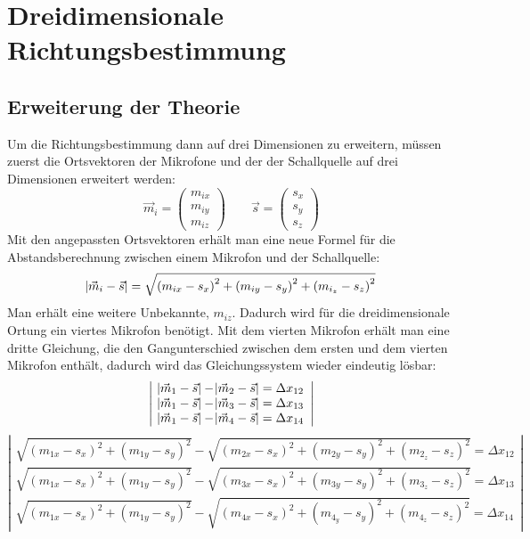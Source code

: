 \section{Dreidimensionale Richtungsbestimmung}
\subsection{Erweiterung der Theorie}
Um die Richtungsbestimmung dann auf drei Dimensionen zu erweitern, müssen zuerst die Ortsvektoren der Mikrofone und der der Schallquelle auf drei Dimensionen erweitert werden: $$\vec{m}_i = \begin{pmatrix}
m_{ix} \\
m_{iy} \\
m_{iz}
\end{pmatrix} \quad\quad
\vec{s} = \begin{pmatrix}
{s_x} \\
{s_y} \\
{s_z}
\end{pmatrix}$$
Mit den angepassten Ortsvektoren erhält man eine neue Formel für die Abstandsberechnung zwischen einem Mikrofon und der Schallquelle:
$$\abs{\vec{m}_i - \vec{s}} = \sqrt{{(m_{ix} - s_x)}^2 + {(m_{iy} - s_y)}^2 + {(m_{i_z} - s_z)}^2}$$
Man erhält eine weitere Unbekannte, $m_{iz}$. Dadurch wird für die dreidimensionale Ortung ein viertes Mikrofon benötigt. Mit dem vierten Mikrofon erhält man eine dritte Gleichung, die den Gangunterschied zwischen dem ersten und dem vierten Mikrofon enthält, dadurch wird das Gleichungssystem wieder eindeutig lösbar:
$$\left|\begin{array}{c}
\abs{\vec{m}_1 - \vec{s}} - \abs{\vec{m}_2 - \vec{s}} = \Delta{x_{12}} \\
\abs{\vec{m}_1 - \vec{s}} - \abs{\vec{m}_3 - \vec{s}} = \Delta{x_{13}} \\
\abs{\vec{m}_1 - \vec{s}} - \abs{\vec{m}_4 - \vec{s}} = \Delta{x_{14}}
\end{array}\right|$$
$$\left|\begin{array}{c}
\sqrt{{(m_{1x} - s_x)}^2 + {(m_{1y} - s_y)}^2} - \sqrt{{(m_{2x} - s_x)}^2 + {(m_{2y} - s_y)}^2 + {(m_{2_z} - s_z)}^2} = \Delta{x_{12}} \\
\sqrt{{(m_{1x} - s_x)}^2 + {(m_{1y} - s_y)}^2} - \sqrt{{(m_{3x} - s_x)}^2 + {(m_{3y} - s_y)}^2 + {(m_{3_z} - s_z)}^2} = \Delta{x_{13}} \\
\sqrt{{(m_{1x} - s_x)}^2 + {(m_{1y} - s_y)}^2} - \sqrt{{(m_{4x} - s_x)}^2 + {(m_{4_y} - s_y)}^2 + {(m_{4_z} - s_z)}^2} = \Delta{x_{14}}
\end{array}\right|$$
